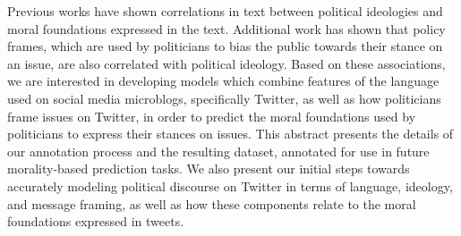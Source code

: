 Previous works have shown correlations in text between political ideologies and moral foundations expressed in the text. Additional work has shown that policy frames, which are used by politicians to bias the public towards their stance on an issue, are also correlated with political ideology. Based on these associations, we are interested in developing models which combine features of the language used on social media microblogs, specifically Twitter, as well as how politicians frame issues on Twitter, in order to predict the moral foundations used by politicians to express their stances on issues. This abstract presents the details of our annotation process and the resulting dataset, annotated for use in future morality-based prediction tasks. We also present our initial steps towards accurately modeling political discourse on Twitter in terms of language, ideology, and message framing, as well as how these components relate to the moral foundations expressed in tweets.
